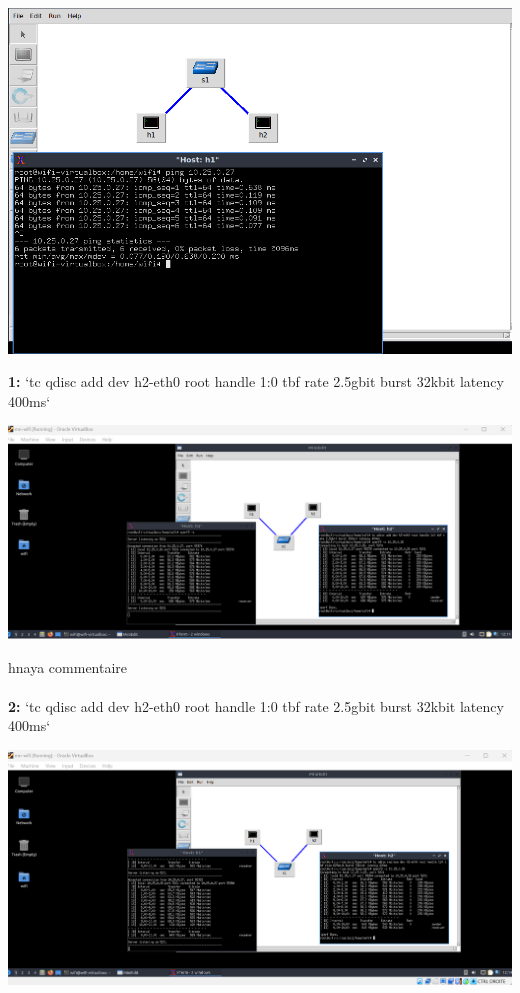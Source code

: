 \vspace{0.5cm}
\begin{center}
    \includegraphics[width=1\textwidth]{./images/T1.2TopologyAndPing.png}
\end{center}
\vspace{1cm}
\textbf{1:} `tc qdisc add dev h2-eth0 root handle 1:0 tbf rate 2.5gbit burst 32kbit latency 400ms`
\begin{center}
    \includegraphics[width=1\textwidth]{./images/11.png}
\end{center}
hnaya commentaire\\
\\
\vspace{1cm}
\textbf{2:} `tc qdisc add dev h2-eth0 root handle 1:0 tbf rate 2.5gbit burst 32kbit latency 400ms`
\begin{center}
    \includegraphics[width=1\textwidth]{./images/13.png}
\end{center}
